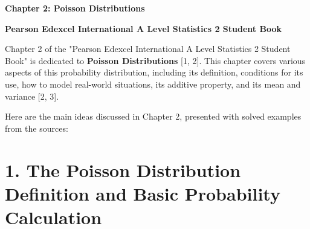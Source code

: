\documentclass[12pt]{article}
\begin{document}
\centerline{\Large\textbf{Chapter 2: Poisson Distributions}}
\centerline{\textbf{Pearson Edexcel International A Level Statistics 2 Student Book}}

\vspace{0.5cm}
Chapter 2 of the "Pearson Edexcel International A Level Statistics 2 Student Book" is dedicated to \textbf{Poisson Distributions} [1, 2]. This chapter covers various aspects of this probability distribution, including its definition, conditions for its use, how to model real-world situations, its additive property, and its mean and variance [2, 3].

Here are the main ideas discussed in Chapter 2, presented with solved examples from the sources:

\section*{1. The Poisson Distribution Definition and Basic Probability Calculation}
\end{document}
